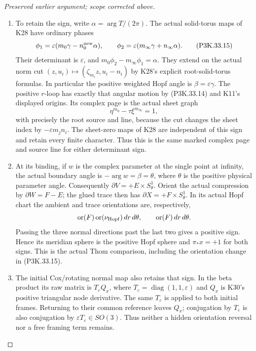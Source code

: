 \begin{proof}[Preserved earlier argument; scope corrected above]
\begin{enumerate}[label=\arabic*.]
\item To retain the sign, write \(\alpha=\arg T/(2\pi)\). The actual
solid-torus maps of K28 have ordinary phases
\[
 \phi_1=\varepsilon(m_0\gamma-n_0^{\rm new}\alpha),\qquad
 \phi_2=\varepsilon(m_\infty\gamma+n_\infty\alpha).
                                                               \tag{P3K.33.15}
\]
Their determinant is \(\varepsilon\), and
\(m_0\phi_2-m_\infty\phi_1=\alpha\). They extend on the
actual norm cut \((z,u_i)\mapsto(\zeta_{m_i}z,u_i-n_i)\)
by K28's explicit root-solid-torus formulas. In particular the
positive weighted Hopf angle is \(\beta=\varepsilon\gamma\).
The positive \(r\)-loop has exactly that angular motion by
(P3K.33.14) and K11's displayed origins. Its complex page is the
actual sheet graph
\[
                 \eta^{m_0}-\tau\xi^{m_\infty}=1,
\]
with precisely the root source and line, because the cut changes
the sheet index by \(-\varepsilon m_jn_i\). The sheet-zero
maps of K28 are independent of this sign and retain every
finite character. Thus this is the same marked complex page
and source line for either determinant sign.

\item At its binding, if \(w\) is the complex parameter at the single
point at infinity, the actual boundary angle is
\(-\arg w=\beta=\theta\), where \(\theta\) is the positive
physical parameter angle. Consequently
\(\partial V=+E\times S^1_\theta\). Orient the actual compression
by \(\partial W=F-E\); the glued trace then has
\(\partial X=+F\times S^1_\theta\). In its actual Hopf chart
the ambient and trace orientations are, respectively,
\[
 \operatorname{or}(F)\operatorname{or}(\nu_{\rm Hopf})\,dr\,d\theta,
 \qquad \operatorname{or}(F)\,dr\,d\theta.
\]
Passing the three normal directions past the last two gives a
positive sign. Hence its meridian sphere is the positive Hopf
sphere and \(\pi_*x=+1\) for both signs. This is the actual
Thom comparison, including the orientation change in (P3K.33.15).

\item The initial Cox/rotating normal map also retains that sign.
In the beta product its raw matrix is
\(T_\varepsilon Q_x\), where
\(T_\varepsilon=\operatorname{diag}(1,1,\varepsilon)\) and
\(Q_x\) is K30's positive triangular node derivative. The same
\(T_\varepsilon\) is applied to both initial frames. Returning
to their common reference leaves \(Q_x\); conjugation by
\(T_\varepsilon\) is also conjugation by
\(\varepsilon T_\varepsilon\in SO(3)\). Thus neither a hidden
orientation reversal nor a free framing term remains.


\end{enumerate}
\end{proof}
